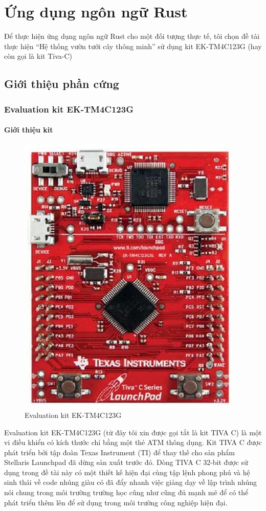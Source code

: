 \chapter{Ứng dụng ngôn ngữ Rust}
Để thực hiện ứng dụng ngôn ngữ Rust cho một đối tượng thực tế, tôi chọn đề tài thực hiện ``Hệ thống vườn tưới cây thông minh'' sử dụng kit EK-TM4C123G (hay còn gọi là kit Tiva-C)

\section{Giới thiệu phần cứng}
\subsection{Evaluation kit EK-TM4C123G}
\subsubsection{Giới thiệu kit}
\begin{figure}[ht]
\centering
\includegraphics[scale=0.5]{images/kit_tivac.jpg}
\caption{Evaluation kit EK-TM4C123G}
\end{figure}

Evaluation kit EK-TM4C123G (từ đây tôi xin được gọi tắt là kit TIVA C) là một vi điều khiển có kích thước chỉ bằng một thẻ ATM thông dụng.
Kit TIVA C được phát triển bởi tập đoàn Texas Instrument (TI) để thay thế cho sản phẩm Stellaris Launchpad đã dừng sản xuất trước đó.
Dòng TIVA C 32-bit được sử dụng trong đề tài này có một thiết kế hiện đại cùng tập lệnh phong phú và hệ sinh thái về code nhúng giàu có
đã đẩy nhanh việc giảng dạy về lập trình nhúng nói chung trong môi trường trường học cũng như cũng đủ mạnh mẽ để có thể phát triển thêm lên để sử dụng trong môi trường công nghiệp hiện đại.


